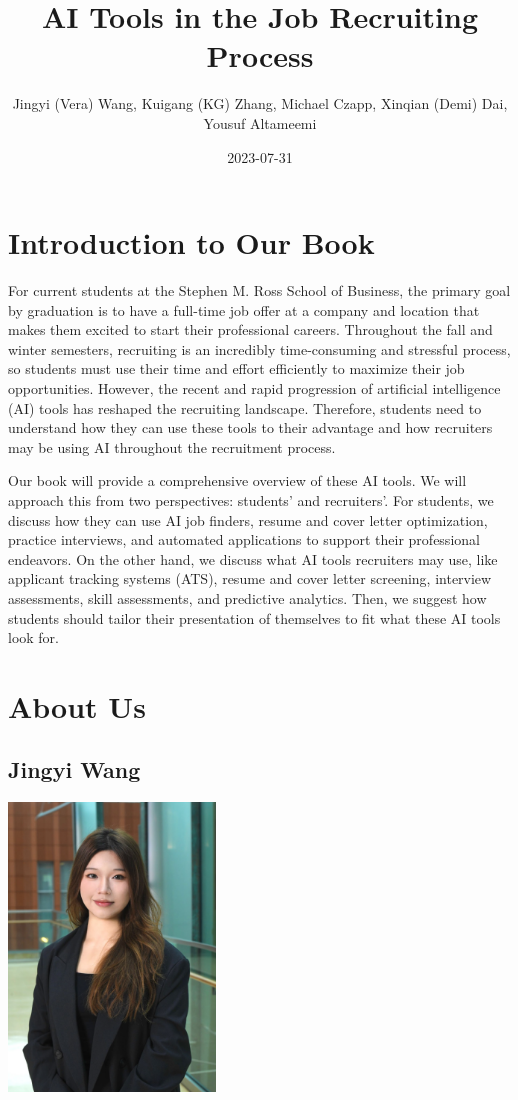 \documentclass[
]{book}
\title{AI Tools in the Job Recruiting Process}
\author{Jingyi (Vera) Wang, Kuigang (KG) Zhang, Michael Czapp, Xinqian (Demi) Dai, Yousuf Altameemi}
\date{2023-07-31}
\begin{document}
\maketitle

{
\setcounter{tocdepth}{1}
\tableofcontents
}
\hypertarget{introduction-to-our-book}{%
\chapter{Introduction to Our Book}\label{introduction-to-our-book}}

For current students at the Stephen M. Ross School of Business, the primary goal by graduation is to have a full-time job offer at a company and location that makes them excited to start their professional careers. Throughout the fall and winter semesters, recruiting is an incredibly time-consuming and stressful process, so students must use their time and effort efficiently to maximize their job opportunities. However, the recent and rapid progression of artificial intelligence (AI) tools has reshaped the recruiting landscape. Therefore, students need to understand how they can use these tools to their advantage and how recruiters may be using AI throughout the recruitment process.

Our book will provide a comprehensive overview of these AI tools. We will approach this from two perspectives: students' and recruiters'. For students, we discuss how they can use AI job finders, resume and cover letter optimization, practice interviews, and automated applications to support their professional endeavors. On the other hand, we discuss what AI tools recruiters may use, like applicant tracking systems (ATS), resume and cover letter screening, interview assessments, skill assessments, and predictive analytics. Then, we suggest how students should tailor their presentation of themselves to fit what these AI tools look for.

\hypertarget{about-us}{%
\chapter{About Us}\label{about-us}}

\hypertarget{jingyi-wang}{%
\section{Jingyi Wang}\label{jingyi-wang}}

\includegraphics[width=2.16667in,height=\textheight]{Vera Photo.png}
\end{document}
